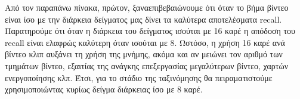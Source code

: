 Από τον παραπάνω πίνακα, πρώτον, ξαναεπιβεβαιώνουμε ότι όταν το βήμα βίντεο είναι ίσο με την  διάρκεια δείγματος μας δίνει τα καλύτερα αποτελέσματα \en recall\gr. Παρατηρούμε ότι όταν η διάρκεια του δείγματος ισούται με  16 καρέ η απόδοση του \en recall \gr είναι
ελαφρώς καλύτερη όταν ισούται με  8.
Ωστόσο, η χρήση  16 καρέ ανά βίντεο κλιπ αυξάνει τη χρήση της μνήμης, ακόμα και αν μειώνει τον αριθμό των τμημάτων βίντεο,
εξαιτίας της ανάγκης επεξεργασίας μεγαλύτερων βίντεο, χαρτών ενεργοποίησης κλπ. Έτσι, για το στάδιο της ταξινόμησης
θα πειραματιστούμε χρησιμοποιώντας κυρίως δείγμα διάρκειας ίσο με  8 καρέ.

